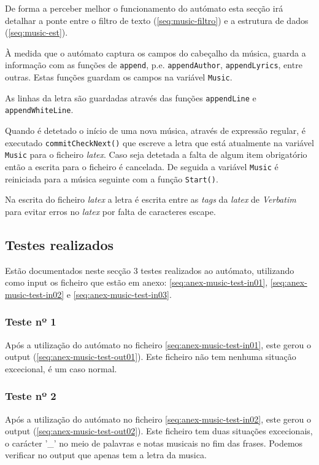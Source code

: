 De forma a perceber melhor o funcionamento do autómato esta secção irá detalhar a ponte entre o filtro de texto (\ref{seq:music-filtro}) e a estrutura de dados (\ref{seq:music-est}).

À medida que o autómato captura os campos do cabeçalho da música, guarda a informação com as funções de \verb!append!, p.e. \verb!appendAuthor!, \verb!appendLyrics!, entre outras. Estas funções guardam os campos na variável \verb!Music!.

As linhas da letra são guardadas através das funções \verb!appendLine! e \verb!appendWhiteLine!.

Quando é detetado o início de uma nova música, através de expressão regular, é executado \verb!commitCheckNext()! que escreve a letra que está atualmente na variável \verb!Music! para o ficheiro \emph{latex}. Caso seja detetada a falta de algum item obrigatório então a escrita para o ficheiro é cancelada.
De seguida a variável \verb!Music! é reiniciada para a música seguinte com a função \verb!Start()!.

Na escrita do ficheiro \emph{latex} a letra é escrita entre as \emph{tags} da \emph{latex} de \emph{Verbatim} para evitar erros no \emph{latex} por falta de caracteres escape.

\subsection{Testes realizados}
\label{seq:music-test}
Estão documentados neste secção 3 testes realizados ao autómato, utilizando como input os ficheiro que estão em anexo: \ref{seq:anex-music-test-in01}, \ref{seq:anex-music-test-in02} e \ref{seq:anex-music-test-in03}.

\subsubsection{Teste nº 1}

Após a utilização do autómato no ficheiro \ref{seq:anex-music-test-in01}, este gerou o output (\ref{seq:anex-music-test-out01}).
Este ficheiro não tem nenhuma situação excecional, é um caso normal.

\subsubsection{Teste nº 2}

Após a utilização do autómato no ficheiro \ref{seq:anex-music-test-in02}, este gerou o output (\ref{seq:anex-music-test-out02}).
Este ficheiro tem duas situações excecionais, o carácter '\_' no meio de palavras e notas musicais no fim das frases.
Podemos verificar no output que apenas tem a letra da musica.

